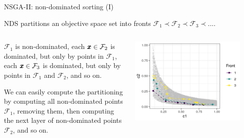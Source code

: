 \documentclass[11pt,compress,t,notes=noshow,xcolor=table]{beamer}
\newcommand{\xx}{\conf}     %
\begin{document}
\begin{vbframe}{NSGA-II: non-dominated sorting (I)}

NDS partitions an objective space set into fronts $\mathcal{F}_1 \prec \mathcal{F}_2 \prec \mathcal{F}_3 \prec ... $.

\begin{columns}
\begin{column}{0.4\textwidth}
\begin{itemize}{\small
    \item $\mathcal{F}_1$ is non-dominated, 
      each $\xx \in \mathcal{F}_2$ is dominated, but only by points in $\mathcal{F}_1$, 
      each $\xx \in \mathcal{F}_3$ is dominated, but only by points in $\mathcal{F}_1$ and $\mathcal{F}_2$, 
      and so on. 
    \item We can easily compute the partitioning by computing all non-dominated points  $\mathcal{F}_1$,
        removing them, then computing the next layer of non-dominated points $\mathcal{F}_2$, and so on.}
\end{itemize}
\end{column}

\begin{column}{0.6\textwidth}
\vspace{0.3cm}
\begin{center}
\includegraphics[width = 0.9\textwidth]{slides/11-multicrit/figure_man/NSGA2_NDS.png}
\end{center}
\end{column}
\end{columns}

\end{vbframe}
\end{document}
